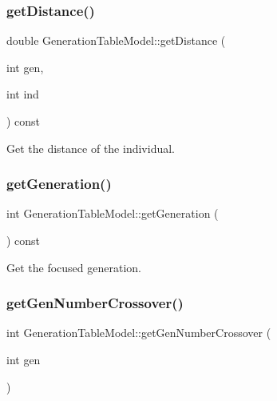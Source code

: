 \subsubsection{\texorpdfstring{get\+Distance()}{getDistance()}}
{\footnotesize\ttfamily double Generation\+Table\+Model\+::get\+Distance (\begin{DoxyParamCaption}\item[{int}]{gen,  }\item[{int}]{ind }\end{DoxyParamCaption}) const}



Get the distance of the individual. 

\mbox{\label{class_generation_table_model_a9f3637c9c02f8ae5f27084335672cbbf}} 
\subsubsection{\texorpdfstring{get\+Generation()}{getGeneration()}}
{\footnotesize\ttfamily int Generation\+Table\+Model\+::get\+Generation (\begin{DoxyParamCaption}{ }\end{DoxyParamCaption}) const}



Get the focused generation. 

\mbox{\label{class_generation_table_model_a6f86eb139344f0059ccddc2c44d433aa}} 
\subsubsection{\texorpdfstring{get\+Gen\+Number\+Crossover()}{getGenNumberCrossover()}}
{\footnotesize\ttfamily int Generation\+Table\+Model\+::get\+Gen\+Number\+Crossover (\begin{DoxyParamCaption}\item[{int}]{gen }\end{DoxyParamCaption})}



